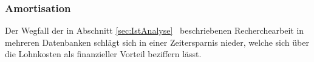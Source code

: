 

\subsubsection{Amortisation}
\label{sec:Amortisations}
Der Wegfall der in Abschnitt \ref{sec:IstAnalyse}~ beschriebenen Recherchearbeit in mehreren Datenbanken schlägt sich
in einer Zeitersparnis nieder, welche sich \ua über die Lohnkosten als finanzieller Vorteil beziffern lässt.\\


